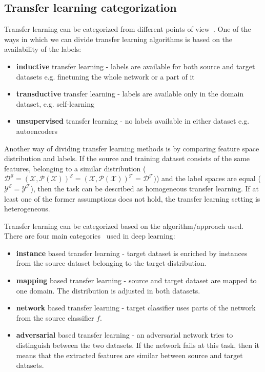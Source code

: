 \documentclass[a4paper,11pt,twoside]{report}
\theoremstyle{definition}
\begin{document}
\subsection{Transfer learning categorization}
Transfer learning can be categorized from different points of view~\cite{comp_survey_transfer_leaerning}. One of the ways in which we can divide transfer learning algorithms is based on the availability of the labels:
\begin{itemize}
\item \textbf{inductive} transfer learning - labels are available for both source and target datasets e.g. finetuning the whole network or a part of it~\cite{finetuning, first_tl}
\item \textbf{transductive} transfer learning - labels are available only in the domain dataset, e.g. self-learning~\cite{selflearning}
\item \textbf{unsupervised} transfer learning - no labels available in either dataset e.g. autoencoders~\cite{unsup_tl, unsup_tl_2}
\end{itemize}
Another way of dividing transfer learning methods is by comparing feature space distribution and labels. If the source and training dataset consists of the same features, belonging to a similar distribution ($\mathcal{D^S} = \mathcal{(X, P(X))^S} = \mathcal{(X, P(X))^T} = \mathcal{D^T})$) and the label spaces are equal ($\mathcal{Y^S} = \mathcal{Y^T} $), then the task can be described as homogeneous transfer learning. If at least one of the former assumptions does not hold, the transfer learning setting is heterogeneous.

Transfer learning can be categorized based on the algorithm/approach used. There are four main categories~\cite{deep_tranfer_learning} used in deep learning:
\begin{itemize}
	\item \textbf{instance} based transfer learning - target dataset is enriched by instances from the source dataset belonging to the target distribution.
	\item \textbf{mapping} based transfer learning - source and target dataset are mapped to one domain. The distribution is adjusted in both datasets.
	\item \textbf{network} based transfer learning - target classifier uses parts of the network from the source classifier $f$.
	\item \textbf{adversarial} based transfer learning - an adversarial network tries to distinguish between the two datasets. If the network fails at this task, then it means that the extracted features are similar between source and target datasets.
\end{itemize}
\end{document}
